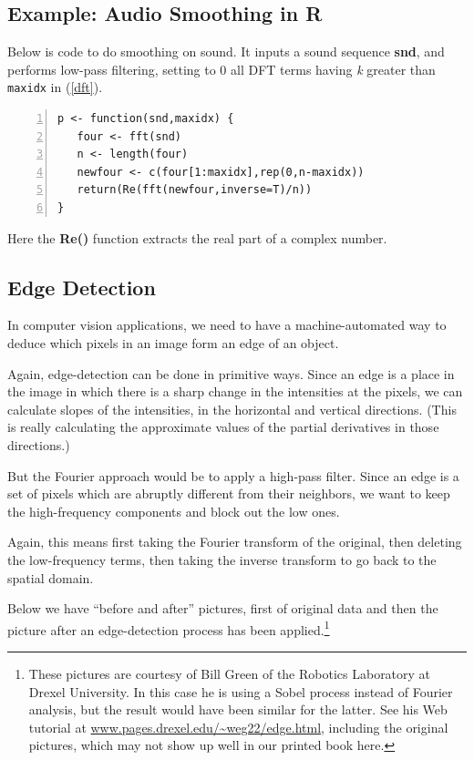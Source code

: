 \subsection{Example:  Audio Smoothing in R}

Below is code to do smoothing on sound.  It inputs a sound sequence {\bf
snd}, and performs low-pass filtering, setting to 0 all DFT terms having
{\it k} greater than {\tt maxidx} in (\ref{dft}).

\begin{Verbatim}[fontsize=\relsize{-2},numbers=left]
p <- function(snd,maxidx) {
   four <- fft(snd)
   n <- length(four)
   newfour <- c(four[1:maxidx],rep(0,n-maxidx))
   return(Re(fft(newfour,inverse=T)/n))
}
\end{Verbatim}

Here the {\bf Re()} function extracts the real part of a complex number.

\subsection{Edge Detection}

In computer vision applications, we need to have a machine-automated way
to deduce which pixels in an image form an edge of an object.

Again, edge-detection can be done in primitive ways.  Since an edge
is a place in the image in which there is a sharp change in the
intensities at the pixels, we can calculate slopes of the intensities, in
the horizontal and vertical directions.  (This is really calculating the
approximate values of the partial derivatives in those directions.)

But the Fourier approach would be to apply a high-pass filter.  Since an
edge is a set of pixels which are abruptly different from their
neighbors, we want to keep the high-frequency components and block out
the low ones.  

Again, this means first taking the Fourier transform of the original,
then deleting the low-frequency terms, then taking the inverse transform
to go back to the spatial domain.

Below we have ``before and after'' pictures, first of original data 
and then the picture after an edge-detection process has been
applied.\footnote{These pictures are courtesy of Bill Green of
the Robotics Laboratory at Drexel University.  In this case he is
using a Sobel process instead of Fourier analysis, but the result would
have been similar for the latter.  See his Web tutorial at
\url{www.pages.drexel.edu/~weg22/edge.html}, including the original
pictures, which may not show up well in our printed book here.}


